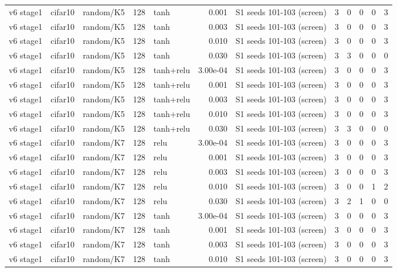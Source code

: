 \begin{table}[htbp]
{\begin{tabular}{@{}lllrlrlrrrrr@{}}
v6 stage1 & cifar10 & random/K5 & 128 & tanh & 0.001 & S1 seeds 101-103 (screen) & 3 & 0 & 0 & 0 & 3 \\
v6 stage1 & cifar10 & random/K5 & 128 & tanh & 0.003 & S1 seeds 101-103 (screen) & 3 & 0 & 0 & 0 & 3 \\
v6 stage1 & cifar10 & random/K5 & 128 & tanh & 0.010 & S1 seeds 101-103 (screen) & 3 & 0 & 0 & 0 & 3 \\
v6 stage1 & cifar10 & random/K5 & 128 & tanh & 0.030 & S1 seeds 101-103 (screen) & 3 & 3 & 0 & 0 & 0 \\
v6 stage1 & cifar10 & random/K5 & 128 & tanh+relu & 3.00e-04 & S1 seeds 101-103 (screen) & 3 & 0 & 0 & 0 & 3 \\
v6 stage1 & cifar10 & random/K5 & 128 & tanh+relu & 0.001 & S1 seeds 101-103 (screen) & 3 & 0 & 0 & 0 & 3 \\
v6 stage1 & cifar10 & random/K5 & 128 & tanh+relu & 0.003 & S1 seeds 101-103 (screen) & 3 & 0 & 0 & 0 & 3 \\
v6 stage1 & cifar10 & random/K5 & 128 & tanh+relu & 0.010 & S1 seeds 101-103 (screen) & 3 & 0 & 0 & 0 & 3 \\
v6 stage1 & cifar10 & random/K5 & 128 & tanh+relu & 0.030 & S1 seeds 101-103 (screen) & 3 & 3 & 0 & 0 & 0 \\
v6 stage1 & cifar10 & random/K7 & 128 & relu & 3.00e-04 & S1 seeds 101-103 (screen) & 3 & 0 & 0 & 0 & 3 \\
v6 stage1 & cifar10 & random/K7 & 128 & relu & 0.001 & S1 seeds 101-103 (screen) & 3 & 0 & 0 & 0 & 3 \\
v6 stage1 & cifar10 & random/K7 & 128 & relu & 0.003 & S1 seeds 101-103 (screen) & 3 & 0 & 0 & 0 & 3 \\
v6 stage1 & cifar10 & random/K7 & 128 & relu & 0.010 & S1 seeds 101-103 (screen) & 3 & 0 & 0 & 1 & 2 \\
v6 stage1 & cifar10 & random/K7 & 128 & relu & 0.030 & S1 seeds 101-103 (screen) & 3 & 2 & 1 & 0 & 0 \\
v6 stage1 & cifar10 & random/K7 & 128 & tanh & 3.00e-04 & S1 seeds 101-103 (screen) & 3 & 0 & 0 & 0 & 3 \\
v6 stage1 & cifar10 & random/K7 & 128 & tanh & 0.001 & S1 seeds 101-103 (screen) & 3 & 0 & 0 & 0 & 3 \\
v6 stage1 & cifar10 & random/K7 & 128 & tanh & 0.003 & S1 seeds 101-103 (screen) & 3 & 0 & 0 & 0 & 3 \\
v6 stage1 & cifar10 & random/K7 & 128 & tanh & 0.010 & S1 seeds 101-103 (screen) & 3 & 0 & 0 & 0 & 3 \\

\end{tabular}}
\end{table}
